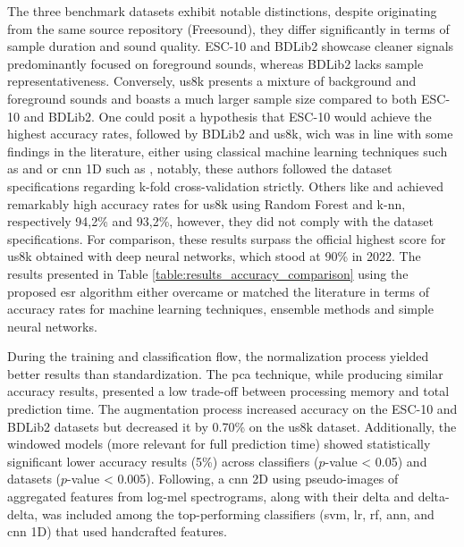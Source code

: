 The three benchmark datasets exhibit notable distinctions, despite originating from the same source repository (Freesound), they differ significantly in terms of sample duration and sound quality. ESC-10 and BDLib2 showcase cleaner signals predominantly focused on foreground sounds, whereas BDLib2 lacks sample representativeness. Conversely, \gls{us8k} presents a mixture of background and foreground sounds and boasts a much larger sample size compared to both ESC-10 and BDLib2. One could posit a hypothesis that ESC-10 would achieve the highest accuracy rates, followed by BDLib2 and \gls{us8k}, wich was in line with some findings in the literature, either using classical machine learning techniques such as \textcite{Silva2019} and \textcite{Bountourakis2019} or \gls{cnn} 1D such as \textcite{Vandendriessche2021}, notably, these authors followed the dataset specifications regarding k-fold cross-validation strictly. Others like \textcite{Lhoest2021} and \textcite{Luz2021} achieved remarkably high accuracy rates for \gls{us8k} using Random Forest and \gls{k-nn}, respectively 94,2\% and 93,2\%, however, they did not comply with the dataset specifications. For comparison, these results surpass the official highest score for \gls{us8k} obtained with deep neural networks, which stood at 90\% in 2022. The results presented in Table \ref{table:results_accuracy_comparison} using the proposed \gls{esr} algorithm either overcame or matched the literature in terms of accuracy rates for machine learning techniques, ensemble methods and simple neural networks.


During the training and classification flow, the normalization process yielded better results than standardization. The \gls{pca} technique, while producing similar accuracy results, presented a low trade-off between processing memory and total prediction time. The augmentation process increased accuracy on the ESC-10 and BDLib2 datasets but decreased it by 0.70\% on the \gls{us8k} dataset. Additionally, the windowed models (more relevant for full prediction time) showed statistically significant lower accuracy results (5\%) across classifiers ($p$-value < 0.05) and datasets ($p$-value < 0.005). Following, a \gls{cnn} 2D using pseudo-images of aggregated features from log-mel spectrograms, along with their delta and delta-delta, was included among the top-performing classifiers (\gls{svm}, \gls{lr}, \gls{rf}, \gls{ann}, and \gls{cnn} 1D) that used handcrafted features.

